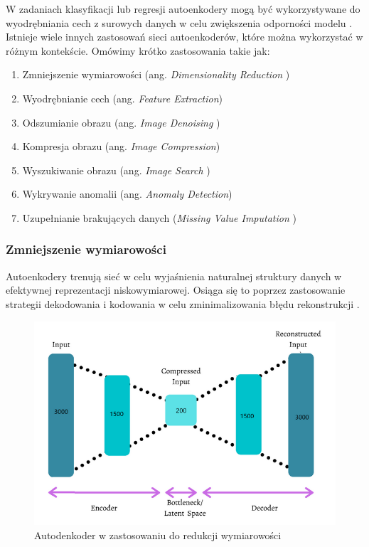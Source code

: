 \documentclass[12pt]{mwbk}
\theoremstyle{plain}
\theoremstyle{definition}
\theoremstyle{remark}
\newcommand\zrodlo[1]{\par\vspace{-3mm}{\small\textit{Źródło: }#1 }}
\begin{document}
W zadaniach klasyfikacji lub regresji autoenkodery mogą być wykorzystywane do wyodrębniania cech z surowych danych w celu zwiększenia odporności modelu \cite{kumar}. Istnieje wiele innych zastosowań sieci autoenkoderów, które można wykorzystać w różnym kontekście. Omówimy krótko zastosowania takie jak:
\begin{enumerate}
\item  Zmniejszenie wymiarowości (ang. \emph{Dimensionality Reduction })

\item  Wyodrębnianie cech (ang. \emph{Feature Extraction})

\item  Odszumianie obrazu (ang. \emph{Image Denoising })

\item  Kompresja obrazu (ang. \emph{Image Compression})

\item Wyszukiwanie obrazu (ang. \emph{ Image Search })

\item Wykrywanie anomalii (ang. \emph{ Anomaly Detection})

\item  Uzupełnianie brakujących danych (\emph{Missing Value Imputation })

\end{enumerate}

\subsubsection{Zmniejszenie wymiarowości}


Autoenkodery trenują sieć w celu wyjaśnienia naturalnej struktury danych w efektywnej reprezentacji niskowymiarowej. Osiąga się to poprzez zastosowanie strategii dekodowania i kodowania w celu zminimalizowania błędu rekonstrukcji \cite{kumar}.



\begin{figure}[!h]
	\centering
	\includegraphics[width=0.8\linewidth]{rys/dimensionality_reduction.png}
	\caption{Autodenkoder w zastosowaniu do redukcji wymiarowości}
	\zrodlo{\cite{kumar}}
	\label{fig:dimensionality-reduction}
\end{figure}
\end{document}
